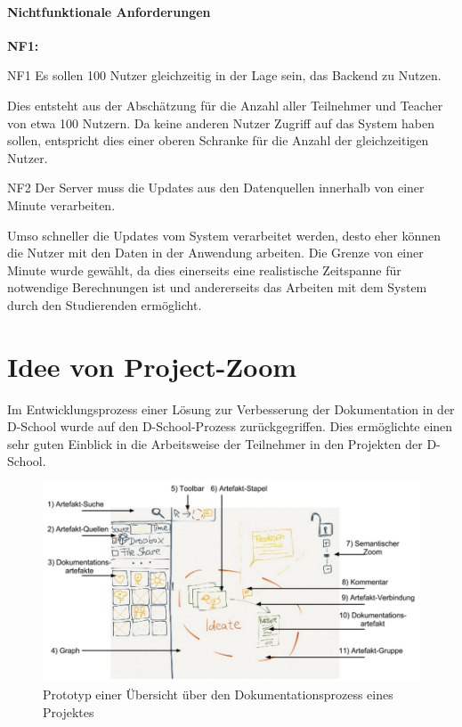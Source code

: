 \paragraph{Nichtfunktionale Anforderungen}
\label{sec:nonfunctional}

\begin{labeling}{\textbf{NF1:}}
  \item[NF1\label{itm:nf1}] Es sollen 100 Nutzer gleichzeitig in der Lage sein, das Backend zu Nutzen.

  Dies entsteht aus der Abschätzung für die Anzahl aller Teilnehmer und Teacher von etwa 100 Nutzern. Da keine anderen Nutzer Zugriff auf das System haben sollen, entspricht dies einer oberen Schranke für die Anzahl der gleichzeitigen Nutzer. 

  \item[NF2\label{itm:nf2}]  Der Server muss die Updates aus den Datenquellen innerhalb von einer Minute verarbeiten.

  Umso schneller die Updates vom System verarbeitet werden, desto eher können die Nutzer mit den Daten in der Anwendung arbeiten. Die Grenze von einer Minute wurde gewählt, da dies einerseits eine realistische Zeitspanne für notwendige Berechnungen ist und andererseits das Arbeiten mit dem System durch den Studierenden ermöglicht.
\end{labeling}


\section{Idee von Project-Zoom}
 
Im Entwicklungsprozess einer Lösung zur Verbesserung der Dokumentation in der D-School wurde auf den D-School-Prozess zurückgegriffen. Dies ermöglichte einen sehr guten Einblick in die Arbeitsweise der Teilnehmer in den Projekten der D-School. 

\begin{figure}[h]  
  \centering     
  \includegraphics[width=1.0\textwidth]{img/projectzoom_prototype.png}  
   \caption{Prototyp einer Übersicht über den Dokumentationsprozess eines Projektes}
  \label{fig:projectzoom_prototype} 
\end{figure}

